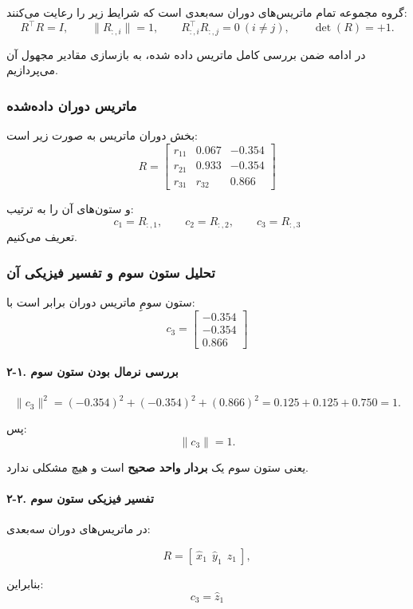 \documentclass{article}
\begin{document}
گروه  مجموعه تمام ماتریس‌های دوران سه‌بعدی است که شرایط زیر را رعایت می‌کنند:
\[
R^\top R = I, \qquad \|R_{:,i}\| = 1, \qquad R_{:,i}^\top R_{:,j}=0 \ (i\neq j), 
\qquad \det(R)=+1.
\]

در ادامه ضمن بررسی کامل ماتریس داده شده، به بازسازی مقادیر مجهول آن می‌پردازیم.

\subsubsection{ماتریس دوران داده‌شده}

بخش دوران ماتریس به صورت زیر است:
\[
R=
\begin{bmatrix}
	r_{11} & 0.067 & -0.354 \\
	r_{21} & 0.933 & -0.354 \\
	r_{31} & r_{32} & 0.866
\end{bmatrix}
\]

و ستون‌های آن را به ترتیب:
\[
c_1 = R_{:,1}, \qquad c_2 = R_{:,2}, \qquad c_3 = R_{:,3}
\]
تعریف می‌کنیم.

\subsubsection{تحلیل ستون سوم و تفسیر فیزیکی آن}

ستون سومِ ماتریس دوران برابر است با:
\[
c_3=
\begin{bmatrix}
	-0.354 \\ -0.354 \\ 0.866
\end{bmatrix}
\]

\paragraph{۲-۱. بررسی نرمال بودن ستون سوم}
\[
\|c_3\|^2 = (-0.354)^2 + (-0.354)^2 + (0.866)^2 = 0.125 + 0.125 + 0.750 = 1.
\]

پس:
\[
\|c_3\| = 1.
\]

یعنی ستون سوم یک \textbf{بردار واحد صحیح} است و هیچ مشکلی ندارد.

\paragraph{۲-۲. تفسیر فیزیکی ستون سوم}

در ماتریس‌های دوران سه‌بعدی:

\[
R = [\ \hat{x}_1\ \ \hat{y}_1\ \ \hat{z}_1\ ],
\]

بنابراین:
\[
c_3 = \hat{z}_1
\]
\end{document}
